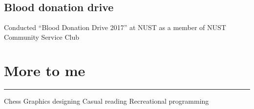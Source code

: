 \documentclass[a4paper, 11pt]{article}
\begin{document}
	\subsection*{Blood donation drive}
	\vspace{-6pt}
	Conducted “Blood Donation Drive 2017” at NUST as a member of NUST Community Service Club
	

	\vspace{-6pt}
	\section*{More to me}
	\vspace{-6pt}
	\hrule
	\vspace{12pt}
	\justifying
	Chess \hspace{1.75cm} Graphics designing \hspace{1.75cm} Casual reading \hspace{1.75cm} Recreational programming
\end{document}
